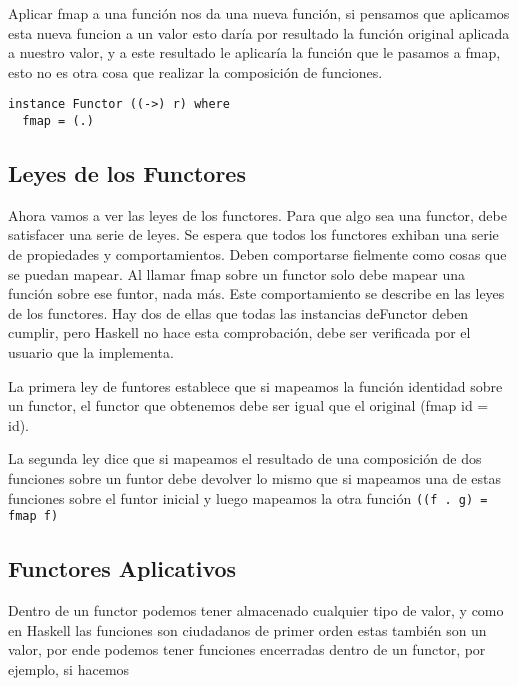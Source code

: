 Aplicar fmap a una función nos da una nueva función, si pensamos que aplicamos esta nueva funcion a un valor esto daría por resultado la función original aplicada a nuestro valor, y a este resultado le aplicaría la función que le pasamos a fmap, esto no es otra cosa que realizar la composición de funciones.

\begin{lstlisting}
instance Functor ((->) r) where
  fmap = (.)
\end{lstlisting}

\subsection{Leyes de los Functores} %
\label{sub:leyes_de_los_functores}


Ahora vamos a ver las leyes de los functores. Para que algo sea una functor, debe satisfacer una serie de leyes. Se espera que todos los functores exhiban una serie de propiedades y comportamientos. Deben comportarse fielmente como cosas que se puedan mapear. Al llamar fmap sobre un functor solo debe mapear una función sobre ese funtor, nada más. Este comportamiento se describe en las leyes de los functores. Hay dos de ellas que todas las instancias deFunctor deben cumplir, pero Haskell no hace esta comprobación, debe ser verificada por el usuario que la implementa.

La primera ley de funtores establece que si mapeamos la función identidad sobre un functor, el functor que obtenemos debe ser igual que el original (fmap id = id).

La segunda ley dice que si mapeamos el resultado de una composición de dos funciones sobre un funtor debe devolver lo mismo que si mapeamos una de estas funciones sobre el funtor inicial y luego mapeamos la otra función \lstinline$((f . g) = fmap f)$


\subsection{Functores Aplicativos} %
\label{sub:functores_aplicativos}


Dentro de un functor podemos tener almacenado cualquier tipo de valor, y como en Haskell las funciones son ciudadanos de primer orden estas también son un valor, por ende podemos tener funciones encerradas dentro de un functor, por ejemplo, si hacemos

